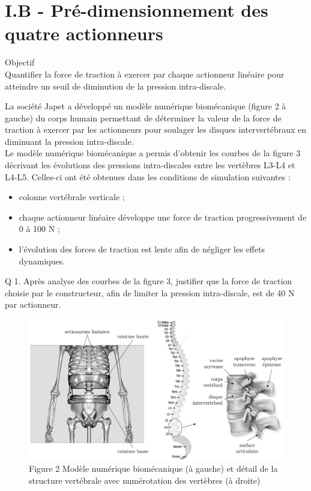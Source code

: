 \documentclass[10pt]{article}
\begin{document}
\section{I.B - Pré-dimensionnement des quatre actionneurs}
\begin{displayquote}
Objectif\\
Quantifier la force de traction à exercer par chaque actionneur linéaire pour atteindre un seuil de diminution de la pression intra-discale.
\end{displayquote}

La société Japet a développé un modèle numérique biomécanique (figure 2 à gauche) du corps humain permettant de déterminer la valeur de la force de traction à exercer par les actionneurs pour soulager les disques intervertébraux en diminuant la pression intra-discale.\\
Le modèle numérique biomécanique a permis d'obtenir les courbes de la figure 3 décrivant les évolutions des pressions intra-discales entre les vertèbres L3-L4 et L4-L5. Celles-ci ont été obtenues dans les conditions de simulation suivantes :

\begin{itemize}
  \item colonne vertébrale verticale ;
  \item chaque actionneur linéaire développe une force de traction progressivement de 0 à 100 N ;
  \item l'évolution des forces de traction est lente afin de négliger les effets dynamiques.
\end{itemize}

Q 1. Après analyse des courbes de la figure 3, justifier que la force de traction choisie par le constructeur, afin de limiter la pression intra-discale, est de 40 N par actionneur.

\begin{figure}[h]
\begin{center}
  \includegraphics[width=\textwidth]{2025_09_16_5f2d7643f7e649c6833dg-02(1)}
\captionsetup{labelformat=empty}
\caption{Figure 2 Modèle numérique biomécanique (à gauche) et détail de la structure vertébrale avec numérotation des vertèbres (à droite)}
\end{center}
\end{figure}
\end{document}
